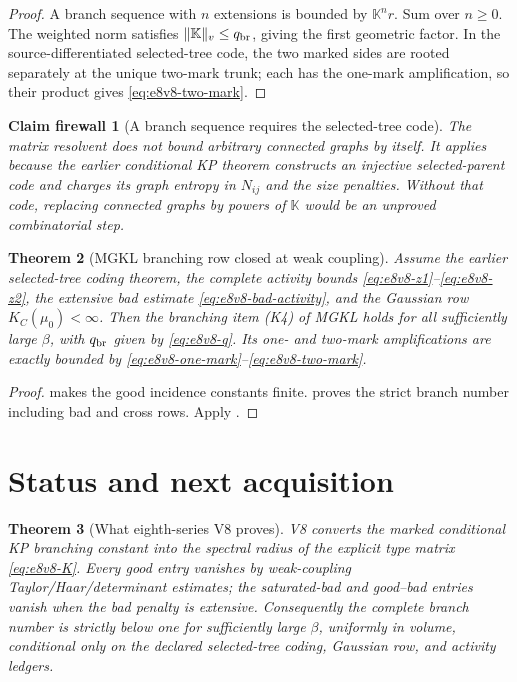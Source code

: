 \documentclass[11pt,oneside]{book}
\newtheorem{theorem}{Theorem}[chapter]
\newtheorem{firewall}[theorem]{Claim firewall}
\theoremstyle{definition}
\theoremstyle{remark}
\begin{document}
\begin{proof}
A branch sequence with \(n\) extensions is bounded by
\({\mathbb K}^nr\).  Sum over \(n\ge0\).  The weighted norm satisfies
\(\|{\mathbb K}\|_v\le q_{\rm br}\), giving the first geometric
factor.  In the source-differentiated selected-tree code, the two
marked sides are rooted separately at the unique two-mark trunk; each
has the one-mark amplification, so their product gives
\eqref{eq:e8v8-two-mark}.
\end{proof}

\begin{firewall}[A branch sequence requires the selected-tree code]
\label{fire:e8v8-code}
The matrix resolvent does not bound arbitrary connected graphs by
itself.  It applies because the earlier conditional KP theorem
constructs an injective selected-parent code and charges its graph
entropy in \(N_{ij}\) and the size penalties.  Without that code,
replacing connected graphs by powers of \({\mathbb K}\) would be an
unproved combinatorial step.
\end{firewall}

\begin{theorem}[MGKL branching row closed at weak coupling]
\label{thm:e8v8-MGKL}
Assume the earlier selected-tree coding theorem, the complete
activity bounds
\eqref{eq:e8v8-z1}--\eqref{eq:e8v8-z2}, the extensive bad estimate
\eqref{eq:e8v8-bad-activity}, and the Gaussian row
\(K_C(\mu_0)<\infty\).  Then the branching item (K4) of MGKL holds
for all sufficiently large \(\beta\), with \(q_{\rm br}\) given by
\eqref{eq:e8v8-q}.  Its one- and two-mark amplifications are exactly
bounded by
\eqref{eq:e8v8-one-mark}--\eqref{eq:e8v8-two-mark}.
\end{theorem}

\begin{proof}
 makes the good incidence constants finite.
 proves the strict branch number including
bad and cross rows.  Apply .
\end{proof}

\section{Status and next acquisition}
\label{sec:e8v8-status}

\begin{theorem}[What eighth-series V8 proves]
\label{thm:e8v8-result}
V8 converts the marked conditional KP branching constant into the
spectral radius of the explicit type matrix
\eqref{eq:e8v8-K}.  Every good entry vanishes by weak-coupling
Taylor/Haar/determinant estimates; the saturated-bad and good--bad
entries vanish when the bad penalty is extensive.  Consequently the
complete branch number is strictly below one for sufficiently large
\(\beta\), uniformly in volume, conditional only on the declared
selected-tree coding, Gaussian row, and activity ledgers.
\end{theorem}
\end{document}
